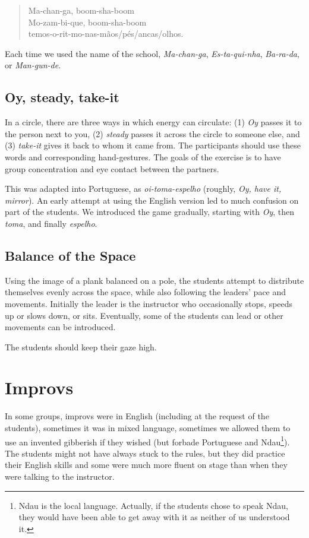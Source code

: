 \documentclass[article,twocolumn,twoside]{memoir}
\begin{document}
\begin{verse}
Ma-chan-ga, boom-sha-boom\\
Mo-zam-bi-que, boom-sha-boom\\
temos-o-rit-mo-nas-mãos/pés/ancas/olhos.
\end{verse}

Each time we used the name of the school, \textit{Ma-chan-ga},
\textit{Es-ta-qui-nha}, \textit{Ba-ra-da}, or \textit{Man-gun-de}.

\subsection{Oy, steady, take-it}
In a circle, there are three ways in which energy can circulate: (1)
\textit{Oy} passes it to the person next to you, (2) \textit{steady} passes it
across the circle to someone else, and (3) \textit{take-it} gives it back to
whom it came from. The participants should use these words and corresponding
hand-gestures. The goals of the exercise is to have group concentration and eye
contact between the partners.

This was adapted into Portuguese, as \textit{oi-toma-espelho} (roughly,
\textit{Oy, have it, mirror}). An early attempt at using the English version
led to much confusion on part of the students. We introduced the game
gradually, starting with \textit{Oy}, then \textit{toma}, and finally
\textit{espelho}.

\subsection{Balance of the Space}

Using the image of a plank balanced on a pole, the students attempt to
distribute themselves evenly across the space, while also following the
leaders' pace and movements. Initially the leader is the instructor who
occasionally stops, speeds up or slows down, or sits. Eventually, some of the
students can lead or other movements can be introduced.

The students should keep their gaze high.

\section{Improvs}

In some groups, improvs were in English (including at the request of the
students), sometimes it was in mixed language, sometimes we allowed them to use
an invented gibberish if they wished (but forbade Portuguese and
Ndau\footnote{Ndau is the local language. Actually, if the students chose to
speak Ndau, they would have been able to get away with it as neither of us
understood it.}). The students might not have always stuck to the rules, but
they did practice their English skills and some were much more fluent on stage
than when they were talking to the instructor.
\end{document}
